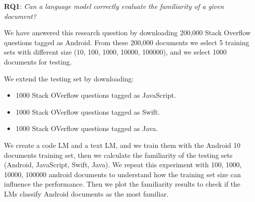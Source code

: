 \documentclass[12pt,mscthesis]{usiinfthesis}
\begin{document}
	 \textbf{RQ1}: \emph{Can a language model correctly evaluate the familiarity of a given document?}


		We have answered this research question by downloading 200,000 Stack Overflow questions tagged as Android. From these 200,000 documents we select 5 training sets with different size (10, 100, 1000, 10000, 100000), and we select 1000 documents for testing.


		We extend the testing set by downloading: 
		\begin{itemize}
			\item 1000 Stack OVerflow questions tagged as JavaScript.
			\item 1000 Stack OVerflow questions tagged as Swift.
			\item 1000 Stack OVerflow questions tagged as Java.
		\end{itemize}

		We create a code LM and a text LM, and we train them with the Android 10 documents training set, then we calculate the familiarity of the testing sets
		(Android, JavaScript, Swift, Java). We repeat this experiment with 100, 1000, 10000, 100000 android documents to understand how the training set size can influence the performance. Then we plot the familiarity results to check if the LMs classify Android documents as the most familiar.\\
\end{document}
